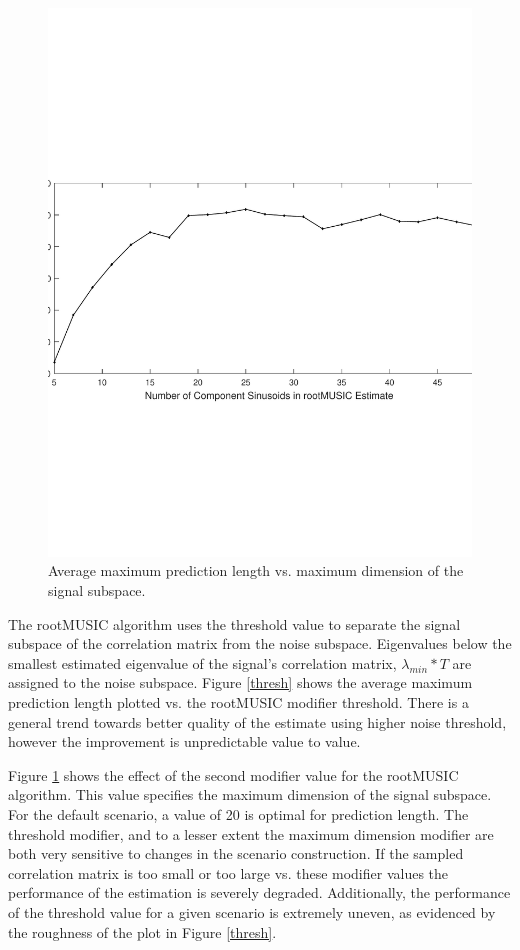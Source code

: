 \documentclass{allertonproc}
\begin{document}
\begin{figure}[ptb]
\begin{center}
\includegraphics[width=6in]{numSinusoids}
\caption{Average maximum prediction length vs. maximum dimension of the signal subspace. }\label{sinusoid}
\end{center}
\end{figure}
The rootMUSIC algorithm uses the threshold value to separate the signal subspace of the correlation matrix from the noise subspace. Eigenvalues below the smallest estimated eigenvalue of the signal's correlation matrix, $\lambda_{min} *T$ are assigned to the noise subspace\cite{matlab}. Figure \ref{thresh} shows the average maximum prediction length plotted vs. the rootMUSIC modifier threshold. There is a general trend towards better quality of the estimate using higher noise threshold, however the improvement is unpredictable value to value.%

Figure \ref{sinusoid} shows the effect of the second modifier value for the rootMUSIC algorithm. This value specifies the maximum dimension of the signal subspace. For the default scenario, a value of 20 is optimal for prediction length. The threshold modifier, and to a lesser extent the maximum dimension modifier are both very sensitive to changes in the scenario construction. If the sampled correlation matrix is too small or too large vs. these modifier values the performance of the estimation is severely degraded. Additionally, the performance of the threshold value for a given scenario is extremely uneven, as evidenced by the roughness of the plot in Figure \ref{thresh}.
\end{document}

